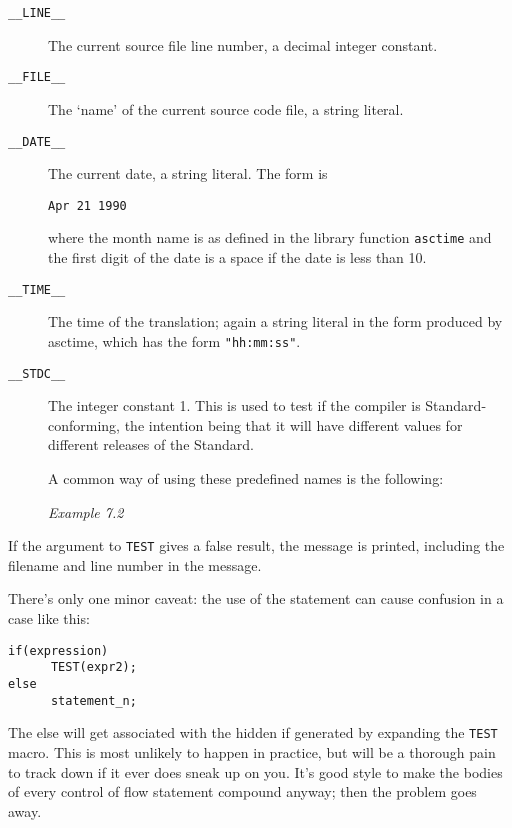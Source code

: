    \begin{description}
    \item[\texttt{\_\_LINE\_\_}] The current source file line number, a decimal integer constant.

    \item[\texttt{\_\_FILE\_\_}] The `name' of the current source code file, a string
     literal.

    \item[\texttt{\_\_DATE\_\_}] 
     The current date, a string literal. The form is

     \begin{Verbatim}
Apr 21 1990
\end{Verbatim}

     where the month name is as defined in the library function
      \texttt{asctime} and the first digit of the date is a space if
      the date is less than 10.

    

    \item[\texttt{\_\_TIME\_\_}] The time of the translation; again a string literal in the form
     produced by asctime, which has the form \texttt{"hh:mm:ss"}.

    \item[\texttt{\_\_STDC\_\_}] 
     The integer constant 1. This is used to test if the compiler is
      Standard-conforming, the intention being that it will have different
      values for different releases of the Standard.

     A common way of using these predefined names is the following:


     \begin{center}\textit{Example 7.2}\end{center}


    
   \end{description}

   If the argument to \texttt{TEST} gives a false result, the message
    is printed, including the filename and line number in the message.


   There's only one minor caveat: the use of the \kif{}
    statement can cause confusion in a case like this:


   \begin{Verbatim}
if(expression)
      TEST(expr2);
else
      statement_n;
\end{Verbatim}

   The else will get associated with the hidden if generated by expanding
    the \texttt{TEST} macro. This is most unlikely to happen in
    practice, but will be a thorough pain to track down if it ever does
    sneak up on you. It's good style to make the bodies of every control of
    flow statement compound anyway; then the problem goes away.


